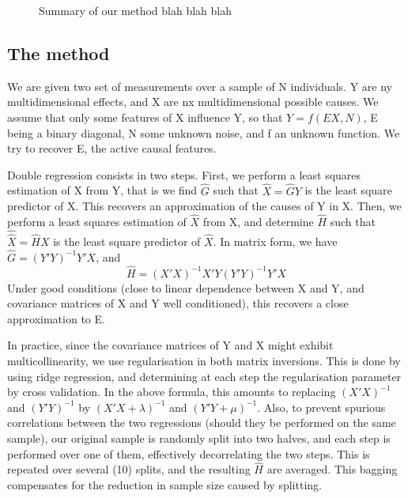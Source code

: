 \documentclass{article}
\begin{document}
\begin{figure}[t!]
    \caption{Summary of our method blah blah blah}
    \label{fig:}
\end{figure}


\subsection{The method}

We are given two set of measurements over a sample of N individuals.
%
Y are ny multidimensional effects, and X are nx multidimensional possible causes.
%
We assume that only some features of X influence Y, so that $Y=f(EX,N)$, E being a binary diagonal, N some unknown noise, and f an unknown function.
%
We try to recover E, the active causal features.

Double regression consists in two steps.
%
First, we perform a least squares estimation of X from Y, that is we find $\hat G$ such that $\hat X=\hat G Y$ is the least square predictor of X.
%
This recovers an approximation of the causes of Y in X.
%
Then, we perform a least squares estimation of $\hat X$ from X, and determine $\hat H$ such that $\hat {\hat X}=\hat H X$ is the least square predictor of $\hat X$.
%
In matrix form, we have $\hat G=(Y'Y)^{-1} Y'X$, and
\begin{equation} \hat H=(X'X)^{-1} X'Y(Y'Y)^{-1} Y'X\end{equation}
Under good conditions (close to linear dependence between X and Y, and covariance matrices of X and Y well conditioned), this recovers a close approximation to E.

In practice, since the covariance matrices of Y and X might exhibit multicollinearity, we use regularisation in both matrix inversions.
%
This is done by using ridge regression, and determining at each step the regularisation parameter by cross validation.
%
In the above formula, this amounts to replacing $(X'X)^{-1}$ and $(Y'Y)^{-1}$ by $(X'X+\lambda)^{-1}$ and $(Y'Y+\mu)^{-1}$.
%
Also, to prevent spurious correlations between the two regressions (should they be performed on the same sample), our original sample is randomly split into two halves, and each step is performed over one of them, effectively decorrelating the two steps.
%
This is repeated over several (10) splits, and the resulting $\hat H$ are averaged.
%
This bagging compensates for the reduction in sample size caused by splitting.
\end{document}
